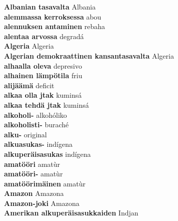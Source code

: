 \textbf{ Albanian tasavalta  } Albania \\
\textbf{ alemmassa kerroksessa  } abou \\
\textbf{ alennuksen antaminen  } rebaha \\
\textbf{ alentaa arvossa  } degradá \\
\textbf{ Algeria  } Algeria \\
\textbf{ Algerian demokraattinen kansantasavalta  } Algeria \\
\textbf{ alhaalla oleva  } depresivo \\
\textbf{ alhainen lämpötila  } friu \\
\textbf{ alijäämä  } deficit \\
\textbf{ alkaa olla jtak  } kuminsá \\
\textbf{ alkaa tehdä jtak  } kuminsá \\
\textbf{ alkoholi-  } alkohóliko \\
\textbf{ alkoholisti-  } buraché \\
\textbf{ alku-  } original \\
\textbf{ alkuasukas-  } indígena \\
\textbf{ alkuperäisasukas  } indígena \\
\textbf{ amatööri  } amatùr \\
\textbf{ amatööri-  } amatùr \\
\textbf{ amatöörimäinen  } amatùr \\
\textbf{ Amazon  } Amazona \\
\textbf{ Amazon-joki  } Amazona \\
\textbf{ Amerikan alkuperäisasukkaiden  } Indjan \\
